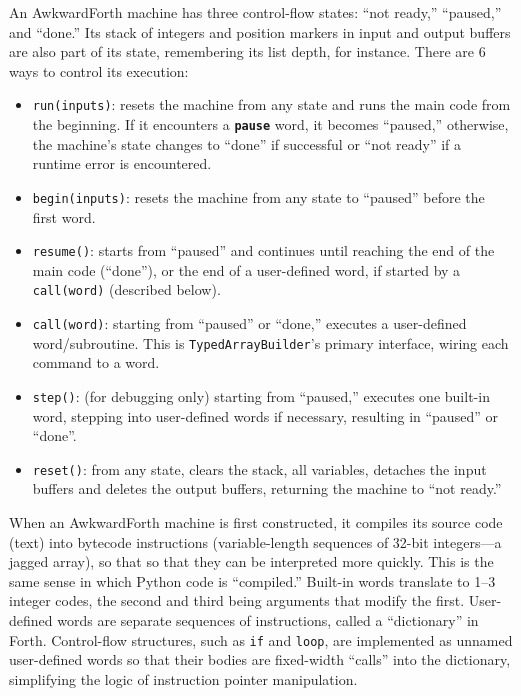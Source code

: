 \documentclass{webofc}
\begin{document}
An AwkwardForth machine has three control-flow states: ``not ready,'' ``paused,'' and ``done.'' Its stack of integers and position markers in input and output buffers are also part of its state, remembering its list depth, for instance. There are 6 ways to control its execution:
\begin{itemize}
\item \texttt{run(inputs)}: resets the machine from any state and runs the main code from the beginning. If it encounters a \textcolor{OliveGreen}{\tt\textbf{pause}} word, it becomes ``paused,'' otherwise, the machine's state changes to ``done'' if successful or ``not ready'' if a runtime error is encountered.
\item \texttt{begin(inputs)}: resets the machine from any state to ``paused'' before the first word.
\item \texttt{resume()}: starts from ``paused'' and continues until reaching the end of the main code (``done''), or the end of a user-defined word, if started by a \texttt{call(word)} (described below).
\item \texttt{call(word)}: starting from ``paused'' or ``done,'' executes a user-defined word/subroutine. This is \texttt{TypedArrayBuilder}'s primary interface, wiring each command to a word.
\item \texttt{step()}: (for debugging only) starting from ``paused,'' executes one built-in word, stepping into user-defined words if necessary, resulting in ``paused'' or ``done''.
\item \texttt{reset()}: from any state, clears the stack, all variables, detaches the input buffers and deletes the output buffers, returning the machine to ``not ready.''
\end{itemize}

When an AwkwardForth machine is first constructed, it compiles its source code (text) into bytecode instructions (variable-length sequences of 32-bit integers---a jagged array), so that so that they can be interpreted more quickly. This is the same sense in which Python code is ``compiled.'' Built-in words translate to 1--3 integer codes, the second and third being arguments that modify the first. User-defined words are separate sequences of instructions, called a ``dictionary'' in Forth. Control-flow structures, such as \texttt{if} and \texttt{loop}, are implemented as unnamed user-defined words so that their bodies are fixed-width ``calls'' into the dictionary, simplifying the logic of instruction pointer manipulation.
\end{document}
